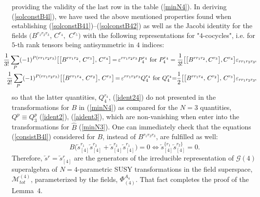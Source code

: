 \documentclass[10pt]{article}
\begin{document}
providing the validity of the last  row in the table (\ref{minN4}).
In deriving (\ref{solconstB4l}),   we have used  the above mentioned properties found when establishing (\ref{solconstB41})--(\ref{solconstB42})  as well as the Jacobi identity for the fields  $\big({B}^{r_1r_2r_3}$, $C^{r_4},$  $C^{r_5})$ with the following representations for "$4$-cocycles", i.e. for $5$-th rank  tensors  being antisymmetric in $4$ indices:
\begin{eqnarray}
&\hspace{-1.2em}& \hspace{-1.2em}\frac{1}{3!}\sum_P(-1)^{P(rr_1r_2r_3)}\big[\big[B^{rr_1r_2},\, C^{r_3}\big],\,C^{r_4}\big]  \hspace{-0.1em}  =    \hspace{-0.1em} \varepsilon^{rr_1r_2r_3} P^{r_4}_4   \ \mathrm{for }\   P^{r_4}_4  = \frac{1}{3!} \big[\big[B^{rr_1r_2},C^{r_3}\big],C^{r_4}\big] \varepsilon_{rr_1r_2r_3}\hspace{-0.1em},  \label{ident14} \\
  &\hspace{-1.2em}&\hspace{-1.2em}   \frac{1}{2!}\sum_P(-1)^{P(rr_1r_2r_3)}\big[\big[B^{rr_1r_4},\, C^{r_2}\big],\,C^{r_3}\big]  \hspace{-0.1em}  =    \hspace{-0.1em} \varepsilon^{rr_1r_2r_3} Q^{r_4}_4  \ \mathrm{for}\ Q^{r_4}_4  \hspace{-0.1cm} =  \hspace{-0.1cm} \frac{1}{2}\big[\big[B^{rr_1r_4},\, C^{r_2}\big],\,C^{r_3}\big] \varepsilon_{rr_1r_2r_3}\hspace{-0.1em}, \label{ident24}
\end{eqnarray}
so that the latter quantities,  $Q^{r_4}_4$, (\ref{ident24}) do not presented in  the transformations for $B$ in (\ref{minN4}) as compared for the $N=3$ quantities, $Q^{p} \equiv Q^{p}_3$ (\ref{ident2}), (\ref{aident3}),  which are non-vanishing when enter into the transformations  for $\widehat{B}$ (\ref{minN3}).
One can  immediately check  that the  equations (\ref{consistB4l}) considered
for ${B}$, instead of $B^{r_1r_2r_3}$, are fulfilled as well:
\begin{equation}\label{consisttot4}
  {B}\big(\overleftarrow{s}{}^{r_1}_{[4]}\overleftarrow{s}{}^{r_2}_{[4]}+\overleftarrow{s}{}^{r_2}_{[4]}\overleftarrow{s}{}^{r_1}_{[4]}\big) =0 \Leftrightarrow \overleftarrow{s}{}^{\{r_1}_{[4]}\overleftarrow{s}{}^{r_2\}}_{[4]} =0.
\end{equation}
Therefore, $\overleftarrow{s}{}^{r} = \overleftarrow{s}{}^{r}_{[4]}$ are the generators of the irreducible representation of  $\mathcal{G}(4)$ superalgebra
of $N=4$-parametric SUSY transformations
in the field superspace, $\mathcal{M}^{(4)}_{tot}$, parameterized by the fields, $\Phi^{A_4}_{(4)}$.  That fact completes the proof of the Lemma~4.
\end{document}
